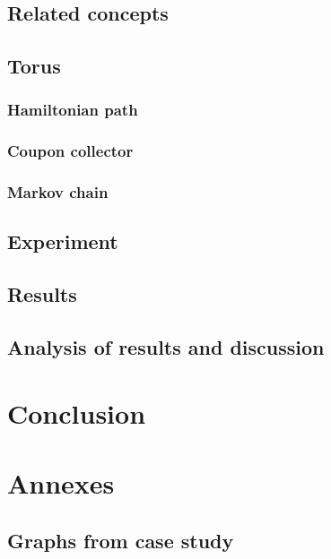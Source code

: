 \documentclass{article}
\begin{document}
\subsection{Related concepts}
\subsection{Torus}
\subsubsection{Hamiltonian path}
\subsubsection{Coupon collector}
\subsubsection{Markov chain}
\subsection{Experiment}
\subsection{Results}
\subsection{Analysis of results and discussion}

\section{Conclusion}


\section{Annexes}
\subsection{Graphs from case study}
\end{document}
